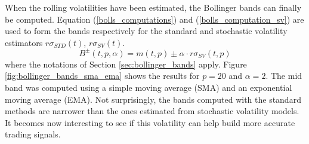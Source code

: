 \documentclass[11pt,a4,twosided,singlespacing,titlepagenumber=on]{scrreprt}
\numberwithin{equation}{chapter} %
\theoremstyle{remark}
\begin{document}
When the rolling volatilities have been estimated, the Bollinger bands can finally be computed. Equation (\ref{bolls_computations}) and (\ref{bolls_computation_sv}) are used to form the bands respectively for the standard and stochastic volatility estimators $r\sigma_{STD}(t)$, $r\sigma_{SV}(t)$.
\begin{equation}
\label{bolls_computation_sv}
B^\pm(t,p,\alpha) = m(t,p) \pm \alpha \cdot r\sigma_{SV}(t,p)
\end{equation}
where the notations of Section \ref{sec:bollinger_bands} apply. Figure \ref{fig:bollinger_bands_sma_ema} shows the results for $p=20$ and $\alpha = 2$. The mid band was computed using a simple moving average (SMA) and an exponential moving average (EMA). Not surprisingly, the bands computed with the standard methods are narrower than the ones estimated from stochastic volatility models. It becomes now interesting to see if this volatility can help build more accurate trading signals.
\end{document}

